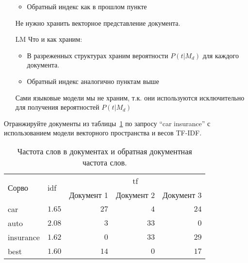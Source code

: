 \begin{solution}
\begin{itemize}
\begin{itemize}
		\item Обратный индекс как в прошлом пункте
	\end{itemize}
	Не нужно хранить векторное представление документа.
	\item[LM] Что и как храним:
		\begin{itemize}
			\item В разреженных структурах храним вероятности $P(t | M_d)$ для каждого документа.
			\item Обратный индекс аналогично пунктам выше
		\end{itemize}
		Сами языковые модели мы не храним, т.к. они используются исключительно для получения вероятностей $P(t | M_d)$
\end{itemize}
\end{solution}

\begin{task}[4]
Отранжируйте документы из таблицы~\ref{table:task4} по запросу “car insurance” с использованием
модели векторного пространства и весов TF-IDF.
\begin{table}[ht!]
\centering
\begin{tabular}{llrrr}
    \multirow{2}{*}{Сорво} & \multirow{2}{*}{idf} & \multicolumn{3}{c}{tf} \\
    \cline{3-5}
    & & Документ 1 & Документ 2 & Документ 3 \\ 
    \hline
	car & $1.65$       & $27$ & $4$ & $24$ \\
	auto & $2.08$      & $3$ & $33$ & $0$ \\
	insurance & $1.62$ & $0$ & $33$ & $29$ \\
	best & $1.60$      & $14$ & $0$ & $17$
\end{tabular}
\caption{Частота слов в документах и обратная документная частота слов.}
\label{table:task4}
\end{table}
\end{task}
